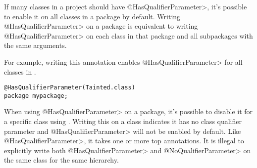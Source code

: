 
If many classes in a project should have \<@HasQualifierParameter>, it's
possible to enable it on all classes in a package by default. Writing
\<@HasQualifierParameter> on a package is equivalent to writing
\<@HasQualifierParameter> on each class in that package and all subpackages with
the same arguments.

For example, writing this annotation enables \<@HasQualifierParameter>
for all classes in .

\begin{Verbatim}
@HasQualifierParameter(Tainted.class)
package mypackage;
\end{Verbatim}

When using \<@HasQualifierParameter> on a package, it's possible to disable it
for a specific class using .
Writing this on a class indicates it has no class qualifier parameter and
\<@HasQualifierParameter> will not be enabled by default. Like
\<@HasQualifierParameter>, it takes one or more top annotations. It is illegal
to explicitly write both \<@HasQualifierParameter> and \<@NoQualifierParameter>
on the same class for the same hierarchy.

%
%
%


